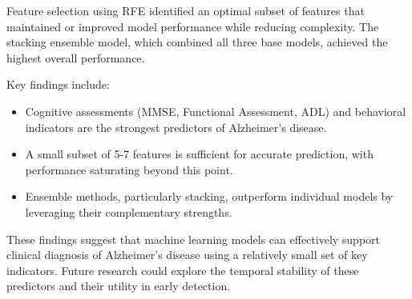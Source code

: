 \documentclass[12pt]{article}
\begin{document}
Feature selection using RFE identified an optimal subset of features that maintained or improved model performance while reducing complexity. The stacking ensemble model, which combined all three base models, achieved the highest overall performance.

Key findings include:
\begin{itemize}
    \item Cognitive assessments (MMSE, Functional Assessment, ADL) and behavioral indicators are the strongest predictors of Alzheimer's disease.
    \item A small subset of 5-7 features is sufficient for accurate prediction, with performance saturating beyond this point.
    \item Ensemble methods, particularly stacking, outperform individual models by leveraging their complementary strengths.
\end{itemize}

These findings suggest that machine learning models can effectively support clinical diagnosis of Alzheimer's disease using a relatively small set of key indicators. Future research could explore the temporal stability of these predictors and their utility in early detection.


\printbibliography
\end{document}
